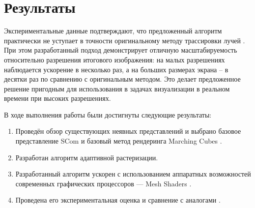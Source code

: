 \section{Результаты}
\label{sec:results}

Экспериментальные данные подтверждают, что предложенный алгоритм практически не уступает в точности оригинальному методу трассировки лучей \cite{garifullin2025compact}. При этом разработанный подход демонстрирует отличную масштабируемость относительно разрешения итогового изображения: на малых разрешениях наблюдается ускорение в несколько раз, а на больших размерах экрана -- в десятки раз по сравнению с оригинальным методом. Это делает предложенное решение пригодным для использования в задачах визуализации в реальном времени при высоких разрешениях.

В ходе выполнения работы были достигнуты следующие результаты:

\begin{enumerate}
\item Проведён обзор существующих неявных представлений и выбрано базовое представление SCom \cite{garifullin2025compact} и базовый метод рендеринга Marching Cubes \cite{lorensen1987marching}.
\item Разработан алгоритм адаптивной растеризации.
\item Разработанный алгоритм ускорен с использованием аппаратных возможностей современных графических процессоров --- Mesh Shaders \cite{nvidia_mesh_shaders}.
\item Проведена его экспериментальная оценка и сравнение с аналогами \cite{garifullin2025compact}\cite{soderlund2022ray}\cite[с.~34]{RTR4}.
\end{enumerate}

